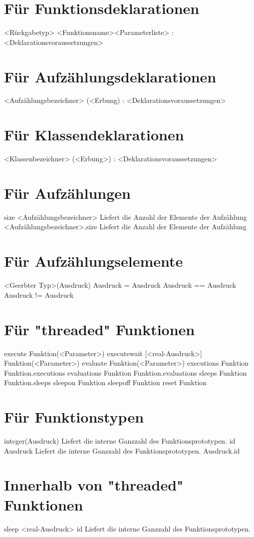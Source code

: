 \section{Für Funktionsdeklarationen}
<Rückgabetyp> <Funktionsname><Parameterliste> : <Deklarationsvoraussetzungen>

\section{Für Aufzählungsdeklarationen}
<Aufzählungsbezeichner> (<Erbung) : <Deklarationsvoraussetzungen>

\section{Für Klassendeklarationen}
<Klassenbezeichner> (<Erbung>) : <Deklarationsvoraussetzungen>

\section{Für Aufzählungen}
size <Aufzählungsbezeichner>			Liefert die Anzahl der Elemente der Aufzählung
<Aufzählungsbezeichner>.size			Liefert die Anzahl der Elemente der Aufzählung

\section{Für Aufzählungselemente}
<Geerbter Typ>(Ausdruck)
Ausdruck = Ausdruck
Ausdruck == Ausdruck
Ausdruck != Ausdruck

\section{Für "threaded" Funktionen}
execute Funktion(<Parameter>)
executewait [<real-Ausdruck>] Funktion(<Parameter>)
evaluate Funktion(<Parameter>)
executions Funktion
Funktion.executions
evaluations Funktion
Funktion.evaluations
sleeps Funktion
Funktion.sleeps
sleepon Funktion
sleepoff Funktion
reset Funktion

\section{Für Funktionstypen}
integer(Ausdruck)				Liefert die interne Ganzzahl des Funktionsprototypen.
id Ausdruck					Liefert die interne Ganzzahl des Funktionsprototypen.
Ausdruck.id

\section{Innerhalb von "threaded" Funktionen}
sleep <real-Ausdruck>
id						Liefert die interne Ganzzahl des Funktionsprototypen.

